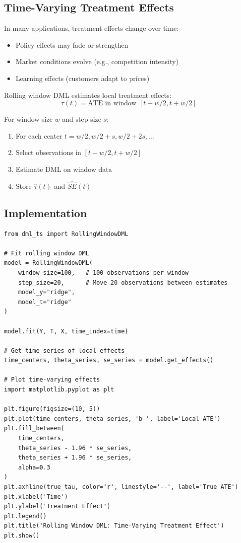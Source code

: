 \subsection{Time-Varying Treatment Effects}

In many applications, treatment effects change over time:
\begin{itemize}
    \item Policy effects may fade or strengthen
    \item Market conditions evolve (e.g., competition intensity)
    \item Learning effects (customers adapt to prices)
\end{itemize}

Rolling window DML estimates local treatment effects:
\begin{equation}
\tau(t) = \text{ATE in window } [t - w/2, t + w/2]
\end{equation}

\begin{definition}
\label{def:rolling_window_dml}
For window size $w$ and step size $s$:
\begin{enumerate}
    \item For each center $t = w/2, w/2 + s, w/2 + 2s, \ldots$
    \item Select observations in $[t - w/2, t + w/2]$
    \item Estimate DML on window data
    \item Store $\hat{\tau}(t)$ and $\widehat{SE}(t)$
\end{enumerate}
\end{definition}

\subsection{Implementation}

\begin{verbatim}
from dml_ts import RollingWindowDML

# Fit rolling window DML
model = RollingWindowDML(
    window_size=100,   # 100 observations per window
    step_size=20,      # Move 20 observations between estimates
    model_y="ridge",
    model_t="ridge"
)

model.fit(Y, T, X, time_index=time)

# Get time series of local effects
time_centers, theta_series, se_series = model.get_effects()

# Plot time-varying effects
import matplotlib.pyplot as plt

plt.figure(figsize=(10, 5))
plt.plot(time_centers, theta_series, 'b-', label='Local ATE')
plt.fill_between(
    time_centers,
    theta_series - 1.96 * se_series,
    theta_series + 1.96 * se_series,
    alpha=0.3
)
plt.axhline(true_tau, color='r', linestyle='--', label='True ATE')
plt.xlabel('Time')
plt.ylabel('Treatment Effect')
plt.legend()
plt.title('Rolling Window DML: Time-Varying Treatment Effect')
plt.show()
\end{verbatim}

